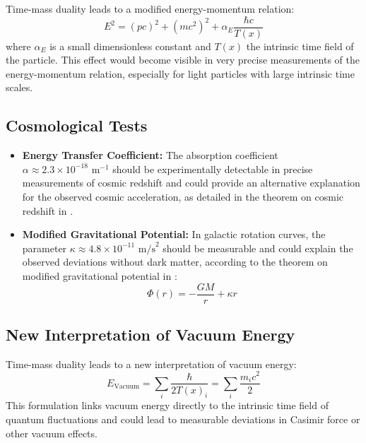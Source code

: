 \documentclass[a4paper,12pt]{article}
\newcommand{\Tfield}{T(x)} %
\begin{document}
	Time-mass duality leads to a modified energy-momentum relation:
	\begin{equation}
		E^2 = (pc)^2 + (mc^2)^2 + \alpha_E\frac{\hbar c}{\Tfield}
	\end{equation}
	where $\alpha_E$ is a small dimensionless constant and $\Tfield$ the intrinsic time field of the particle. This effect would become visible in very precise measurements of the energy-momentum relation, especially for light particles with large intrinsic time scales.
	
	\subsection{Cosmological Tests}
	
	\begin{itemize}
		\item \textbf{Energy Transfer Coefficient:} The absorption coefficient $\alpha \approx 2.3 \times 10^{-18} \text{ m}^{-1}$ should be experimentally detectable in precise measurements of cosmic redshift and could provide an alternative explanation for the observed cosmic acceleration, as detailed in the theorem on cosmic redshift in \cite{pascher_wesentl_2025}.
		
		\item \textbf{Modified Gravitational Potential:} In galactic rotation curves, the parameter $\kappa \approx 4.8 \times 10^{-11} \text{ m/s}^2$ should be measurable and could explain the observed deviations without dark matter, according to the theorem on modified gravitational potential in \cite{pascher_wesentl_2025}:
		\begin{equation}
			\Phi(r) = -\frac{GM}{r} + \kappa r
		\end{equation}
	\end{itemize}
	
	\subsection{New Interpretation of Vacuum Energy}
	
	Time-mass duality leads to a new interpretation of vacuum energy:
	\begin{equation}
		E_{\text{Vacuum}} = \sum_i \frac{\hbar}{2\Tfield_i} = \sum_i \frac{m_i c^2}{2}
	\end{equation}
	This formulation links vacuum energy directly to the intrinsic time field of quantum fluctuations and could lead to measurable deviations in Casimir force or other vacuum effects.
	
\end{document}
